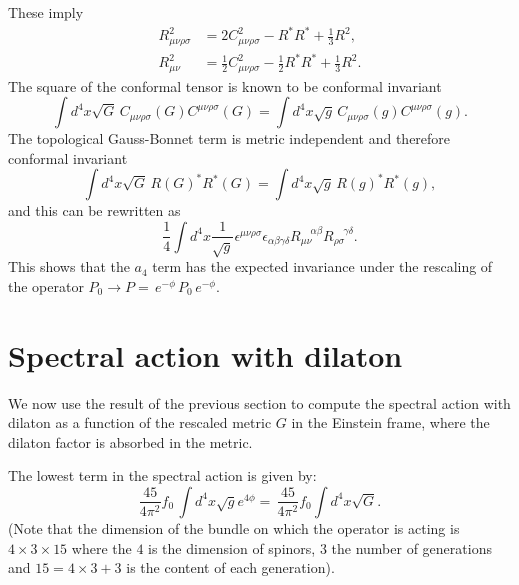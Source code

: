 \documentclass[12pt]{article}%
\begin{document}
These imply
\begin{align*}
R_{\mu\nu\rho\sigma}^{2}  &  =2C_{\mu\nu\rho\sigma}^{2}-R^{\ast}R^{\ast}%
+\frac{1}{3}R^{2},\\
R_{\mu\nu}^{2}  &  =\frac{1}{2}C_{\mu\nu\rho\sigma}^{2}-\frac{1}{2}R^{\ast
}R^{\ast}+\frac{1}{3}R^{2}.
\end{align*}
The square of the conformal tensor is known to be conformal invariant
\[
\int d^{4}x\sqrt{G}\,C_{\mu\nu\rho\sigma}\left(  G\right)  C^{\mu\nu\rho
\sigma}\left(  G\right)  =\int d^{4}x\sqrt{g}\,C_{\mu\nu\rho\sigma}\left(
g\right)  C^{\mu\nu\rho\sigma}\left(  g\right)  .
\]
The topological Gauss-Bonnet term is metric independent and therefore
conformal invariant
\[
\int d^{4}x\sqrt{G}\,R\left(  G\right)  ^{\ast}R^{\ast}\left(  G\right)  =\int
d^{4}x\sqrt{g}\,R\left(  g\right)  ^{\ast}R^{\ast}\left(  g\right)  ,
\]
and this can be rewritten as
\[
\frac{1}{4}\int d^{4}x\frac{1}{\sqrt{g}}\epsilon^{\mu\nu\rho\sigma}%
\epsilon_{\alpha\beta\gamma\delta}R_{\mu\nu}^{\quad\alpha\beta}R_{\rho\sigma
}^{\quad\gamma\delta}.
\]
This shows that the $a_{4}$ term has the expected invariance under the
rescaling of the operator $P_{0}\rightarrow P=\,e^{-\phi}\,P_{0}\,e^{-\phi}$.

\section{\bigskip Spectral action with dilaton}

We now use the result of the previous section to compute the spectral action
with dilaton as a function of the rescaled metric $G$ in the Einstein frame,
where the dilaton factor is absorbed in the metric.

The lowest term in the spectral action is given by:
\[
\frac{45}{4\pi^{2}}f_{0}\,\int d^{4}x\sqrt{g}e^{4\phi}=\,\frac{45}{4\pi^{2}%
}f_{0}\int d^{4}x\sqrt{G}.
\]
(Note that the dimension of the bundle on which the operator is acting is
$4\times3\times15$ where the $4$ is the dimension of spinors, $3$ the number
of generations and $15= 4\times3 +3$ is the content of each generation).
\end{document}
